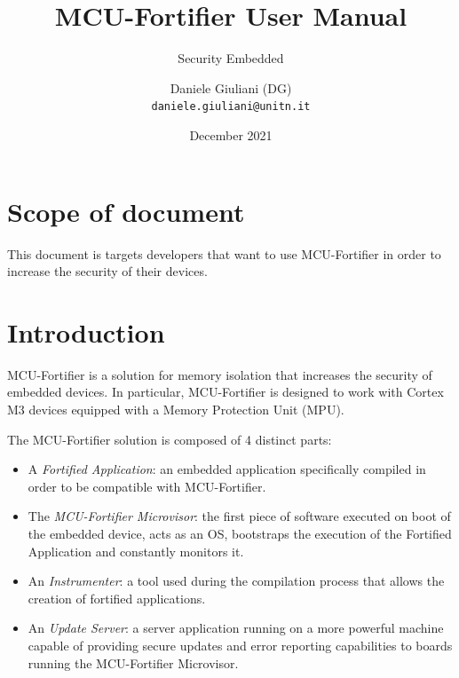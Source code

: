 \documentclass{article}
\title{
MCU-Fortifier User Manual
}
\author{
  Security Embedded\\
  \texttt{}
  \and
  Daniele Giuliani (DG)\\
  \texttt{daniele.giuliani@unitn.it}
}
\date{December 2021}
\begin{document}
\maketitle
\newpage
\begin{versionhistory}
\end{versionhistory}

\newpage
\tableofcontents
\newpage

\section{Scope of document}
This document is targets developers that want to use MCU-Fortifier in order to increase the security of their devices. 

\section{Introduction}
MCU-Fortifier is a solution for memory isolation that increases the security of embedded devices. In particular, MCU-Fortifier is designed to work with Cortex M3 devices equipped with a Memory Protection Unit (MPU).

The MCU-Fortifier solution is composed of 4 distinct parts:
\begin{itemize}
    \item A \textit{Fortified Application}: an embedded application specifically compiled in order to be compatible with MCU-Fortifier.
    \item The \textit{MCU-Fortifier Microvisor}: the first piece of software executed on boot of the embedded device, acts as an OS, bootstraps the execution of the Fortified Application and constantly monitors it.
    \item An \textit{Instrumenter}: a tool used during the compilation process that allows the creation of fortified applications.
    \item An \textit{Update Server}: a server application running on a more powerful machine capable of providing secure updates and error reporting capabilities to boards running the MCU-Fortifier Microvisor.
\end{itemize}
\end{document}
